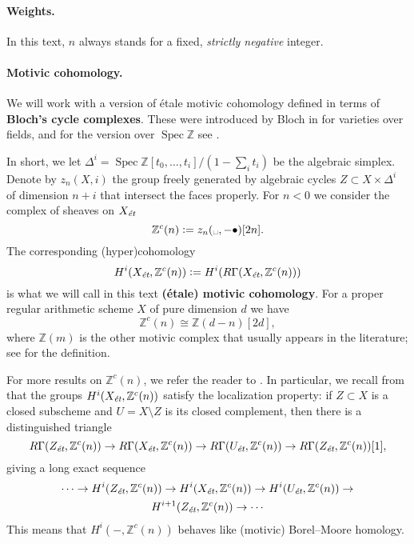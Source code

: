 \documentclass[draft]{article}
\DeclareMathOperator{\Spec}{Spec}
\newcommand{\ZZ}{\mathbb{Z}}
\newcommand{\et}{\text{\it \'{e}t}}
\newcommand{\dfn}{\mathrel{\mathop:}=}
\theoremstyle{myplain}
\theoremstyle{mydefinition}
\numberwithin{equation}{section}
\begin{document}
\paragraph{Weights.}
In this text, $n$ always stands for a fixed, \emph{strictly negative} integer.

\paragraph{Motivic cohomology.}
We will work with a version of \'{e}tale motivic cohomology defined in terms of
\textbf{Bloch's cycle complexes}. These were introduced by Bloch in
\cite{Bloch-1986} for varieties over fields, and for the version over
$\Spec \ZZ$ see \cite{Geisser-2004-Dedekind,Geisser-2005}.

In short, we let $\Delta^i = \Spec \ZZ [t_0,\ldots,t_i] / (1 - \sum_i t_i)$ be
the algebraic simplex. Denote by $z_n (X, i)$ the group freely generated by
algebraic cycles $Z \subset X \times \Delta^i$ of dimension $n+i$ that intersect
the faces properly. For $n < 0$ we consider the complex of sheaves on $X_\et$
$$\ZZ^c (n) \dfn z_n (\text{\textvisiblespace}, -\bullet) [2n].$$
The corresponding (hyper)cohomology
$$H^i (X_\et, \ZZ^c (n)) \dfn H^i (R\Gamma (X_\et, \ZZ^c (n)))$$
is what we will call in this text \textbf{(\'{e}tale) motivic cohomology}.
For a proper regular arithmetic scheme $X$ of pure dimension $d$ we have
\begin{equation}
  \label{eqn:Zc(n)-vs-Z(d-n)}
  \ZZ^c (n) \cong \ZZ (d-n) [2d],
\end{equation}
where $\ZZ (m)$ is the other motivic complex that usually appears in the
literature; see \cite{Geisser-2004-Dedekind,Geisser-2005} for the definition.

For more results on $\ZZ^c (n)$, we refer the reader to \cite{Geisser-2010}. In
particular, we recall from \cite[Corollary~7.2]{Geisser-2010} that the groups
$H^i (X_\et, \ZZ^c (n))$ satisfy the localization property: if $Z \subset X$ is a
closed subscheme and $U = X\setminus Z$ is its closed complement, then there is
a distinguished triangle
\[ R\Gamma (Z_\et, \ZZ^c (n)) \to
  R\Gamma (X_\et, \ZZ^c (n)) \to
  R\Gamma (U_\et, \ZZ^c (n)) \to 
  R\Gamma (Z_\et, \ZZ^c (n)) [1], \]
giving a long exact sequence
\begin{multline}
  \label{eqn:localization-les}
  \cdots \to H^i (Z_\et, \ZZ^c (n)) \to
  H^i (X_\et, \ZZ^c (n)) \to
  H^i (U_\et, \ZZ^c (n)) \to \\
  H^{i+1} (Z_\et, \ZZ^c (n)) \to \cdots
\end{multline}
This means that $H^i (-, \ZZ^c (n))$ behaves like (motivic) Borel--Moore
homology.
\end{document}

